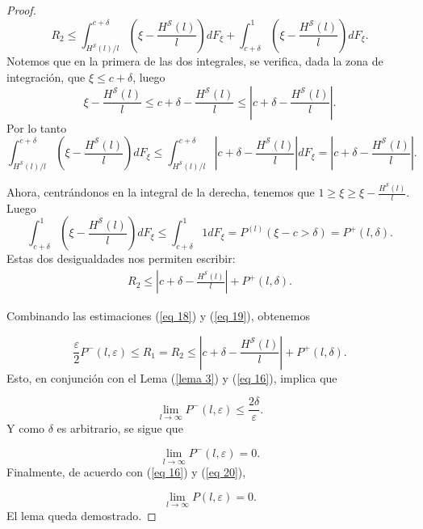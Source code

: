 \documentclass{report}
\begin{document}
\begin{proof}
    \begin{equation*}
        R_2 \leq \int_{H^{\mathcal{S}}(l)/l}^{c + \delta} \left( \xi - \frac{H^{\mathcal{S}}(l)}{l} \right) dF_{\xi}
        + \int_{c + \delta}^{1} \left( \xi - \frac{H^{\mathcal{S}}(l)}{l} \right) dF_{\xi}.
    \end{equation*}
    Notemos que en la primera de las dos integrales, se verifica, dada la zona de integración, que \(\xi \leq c+\delta\),
    luego
    \[
    \xi - \frac{H^{\mathcal{S}}(l)}{l} \leq c + \delta -  \frac{H^{\mathcal{S}}(l)}{l} 
    \leq \left| c + \delta -  \frac{H^{\mathcal{S}}(l)}{l} \right|.
    \]
    Por lo tanto
    \[
        \int_{H^{\mathcal{S}}(l)/l}^{c + \delta} \left( \xi - \frac{H^{\mathcal{S}}(l)}{l} \right) dF_{\xi} 
        \leq \int_{H^{\mathcal{S}}(l)/l}^{c + \delta} \left| c + \delta -  \frac{H^{\mathcal{S}}(l)}{l} \right| dF_{\xi}
        = \left| c + \delta -  \frac{H^{\mathcal{S}}(l)}{l} \right|.
    \]\newline

    Ahora, centrándonos en la integral de la derecha, tenemos que $1\geq\xi\geq \xi-\frac{H^{\mathcal{S}}(l)}{l}$. Luego
    \[
        \int_{c + \delta}^{1} \left( \xi - \frac{H^{\mathcal{S}}(l)}{l} \right) dF_{\xi}
        \leq \int_{c + \delta}^{1} 1 dF_{\xi} = P^{(l)}(\xi-c>\delta) = P^+(l, \delta).
    \]
    Estas dos desigualdades nos permiten escribir:
    \begin{equation}\label{eq 19}
        \begin{aligned}
          R_2\leq \left| c + \delta - \frac{H^{\mathcal{S}}(l)}{l} \right| + P^+(l, \delta).
        \end{aligned}
    \end{equation}\newline

    Combinando las estimaciones (\ref{eq 18}) y (\ref{eq 19}), obtenemos

    \begin{equation}
       \frac{\varepsilon}{2} P^-(l, \varepsilon) \leq R_1 = R_2 \leq \left| c + \delta - \frac{H^{\mathcal{S}}(l)}{l} \right| + P^+(l, \delta).
    \end{equation}
    Esto, en conjunción con el Lema (\ref{lema 3}) y (\ref{eq 16}), implica que

    \begin{equation*}
    \lim_{l \to \infty} P^-(l, \varepsilon) \leq \frac{2\delta}{\varepsilon}.
    \end{equation*}
    Y como \( \delta \) es arbitrario, se sigue que

    \begin{equation}\label{eq 20}
    \lim_{l \to \infty} P^-(l, \varepsilon) = 0.
    \end{equation}
    Finalmente, de acuerdo con (\ref{eq 16}) y (\ref{eq 20}),

    \begin{equation*}
    \lim_{l \to \infty} P(l, \varepsilon) = 0.
    \end{equation*}
    El lema queda demostrado.
\end{proof}
\bigskip
\end{document}
